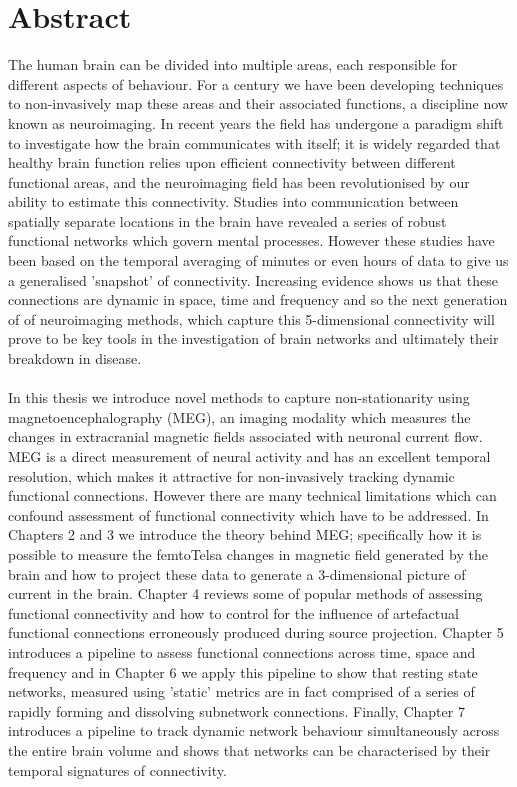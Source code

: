\documentclass[a4paper,11pt,oneside]{book}
\begin{document}
\frontmatter


\tableofcontents

\chapter{Abstract}
The human brain can be divided into multiple areas, each responsible for different aspects of behaviour. For a century we have been developing techniques to non-invasively map these areas and their associated functions, a discipline now known as neuroimaging. In recent years the field has undergone a paradigm shift to investigate how the brain communicates with itself; it is widely regarded that healthy brain function relies upon efficient connectivity between different functional areas, and the neuroimaging field has been revolutionised by our ability to estimate this connectivity. Studies into communication between spatially separate locations in the brain have revealed a series of robust functional networks which govern mental processes. However these studies have been based on the temporal averaging of minutes or even hours of data to give us a generalised 'snapshot' of connectivity. Increasing evidence shows us that these connections are dynamic in space, time and frequency and so the next generation of of neuroimaging methods, which capture this 5-dimensional connectivity will prove to be key tools in the investigation of brain networks and ultimately their breakdown in disease.
\\~\\
In this thesis we introduce novel methods to capture non-stationarity using magnetoencephalography (MEG), an imaging modality which measures the changes in extracranial magnetic fields associated with neuronal current flow. MEG is a direct measurement of neural activity and has an excellent temporal resolution, which makes it  attractive for non-invasively tracking dynamic functional connections. However there are many technical limitations which can confound assessment of functional connectivity which have to be addressed. In Chapters 2 and 3 we introduce the theory behind MEG; specifically how it is possible to measure the femtoTelsa changes in magnetic field generated by the brain and how to project these data to generate a 3-dimensional picture of current in the brain. Chapter 4 reviews some of popular methods of assessing functional connectivity and how to control for the influence of artefactual functional connections erroneously produced during source projection. Chapter 5 introduces a pipeline to assess functional connections across time, space and frequency and in Chapter 6 we apply this pipeline to show that resting state networks, measured using 'static' metrics are in fact comprised of a series of rapidly forming and dissolving subnetwork connections. Finally, Chapter 7 introduces a pipeline to track dynamic network behaviour simultaneously across the entire brain volume and shows that networks can be characterised by their temporal signatures of connectivity.
\end{document}
